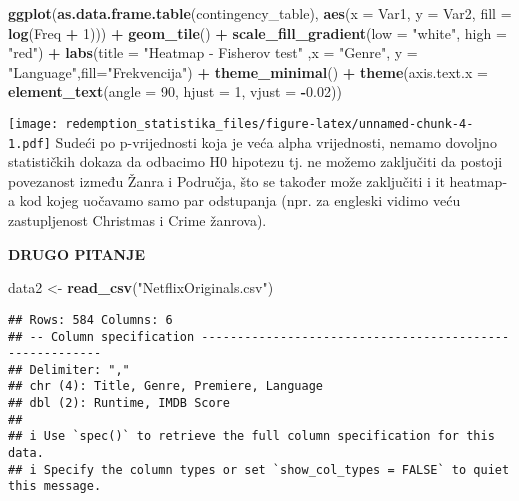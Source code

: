 \documentclass[
]{article}
\newenvironment{Shaded}{\begin{snugshade}}{\end{snugshade}}
\newcommand{\AttributeTok}[1]{\textcolor[rgb]{0.13,0.29,0.53}{#1}}
\newcommand{\DecValTok}[1]{\textcolor[rgb]{0.00,0.00,0.81}{#1}}
\newcommand{\FloatTok}[1]{\textcolor[rgb]{0.00,0.00,0.81}{#1}}
\newcommand{\FunctionTok}[1]{\textcolor[rgb]{0.13,0.29,0.53}{\textbf{#1}}}
\newcommand{\NormalTok}[1]{#1}
\newcommand{\OtherTok}[1]{\textcolor[rgb]{0.56,0.35,0.01}{#1}}
\newcommand{\SpecialCharTok}[1]{\textcolor[rgb]{0.81,0.36,0.00}{\textbf{#1}}}
\newcommand{\StringTok}[1]{\textcolor[rgb]{0.31,0.60,0.02}{#1}}
\begin{document}
\begin{Shaded}
\begin{Highlighting}[]
\FunctionTok{ggplot}\NormalTok{(}\FunctionTok{as.data.frame.table}\NormalTok{(contingency\_table), }\FunctionTok{aes}\NormalTok{(}\AttributeTok{x =}\NormalTok{ Var1, }\AttributeTok{y =}\NormalTok{ Var2, }\AttributeTok{fill =} \FunctionTok{log}\NormalTok{(Freq }\SpecialCharTok{+} \DecValTok{1}\NormalTok{))) }\SpecialCharTok{+}
  \FunctionTok{geom\_tile}\NormalTok{() }\SpecialCharTok{+}
  \FunctionTok{scale\_fill\_gradient}\NormalTok{(}\AttributeTok{low =} \StringTok{"white"}\NormalTok{, }\AttributeTok{high =} \StringTok{"red"}\NormalTok{) }\SpecialCharTok{+}
  \FunctionTok{labs}\NormalTok{(}\AttributeTok{title =} \StringTok{"Heatmap {-} Fisherov test"}\NormalTok{ ,}\AttributeTok{x =} \StringTok{"Genre"}\NormalTok{, }\AttributeTok{y =} \StringTok{"Language"}\NormalTok{,}\AttributeTok{fill=}\StringTok{"Frekvencija"}\NormalTok{) }\SpecialCharTok{+}
  \FunctionTok{theme\_minimal}\NormalTok{() }\SpecialCharTok{+}
  \FunctionTok{theme}\NormalTok{(}\AttributeTok{axis.text.x =} \FunctionTok{element\_text}\NormalTok{(}\AttributeTok{angle =} \DecValTok{90}\NormalTok{, }\AttributeTok{hjust =} \DecValTok{1}\NormalTok{, }\AttributeTok{vjust =} \SpecialCharTok{{-}}\FloatTok{0.02}\NormalTok{))}
\end{Highlighting}
\end{Shaded}

\texttt{[image: redemption\_statistika\_files/figure-latex/unnamed-chunk-4-1.pdf]}
Sudeći po p-vrijednosti koja je veća alpha vrijednosti, nemamo dovoljno
statističkih dokaza da odbacimo H0 hipotezu tj. ne možemo zaključiti da
postoji povezanost između Žanra i Područja, što se također može
zaključiti i it heatmap-a kod kojeg uočavamo samo par odstupanja (npr.
za engleski vidimo veću zastupljenost Christmas i Crime žanrova).

\textbf{DRUGO PITANJE}

\begin{Shaded}
\begin{Highlighting}[]
\NormalTok{data2 }\OtherTok{\textless{}{-}} \FunctionTok{read\_csv}\NormalTok{(}\StringTok{"NetflixOriginals.csv"}\NormalTok{)}
\end{Highlighting}
\end{Shaded}

\begin{verbatim}
## Rows: 584 Columns: 6
## -- Column specification --------------------------------------------------------
## Delimiter: ","
## chr (4): Title, Genre, Premiere, Language
## dbl (2): Runtime, IMDB Score
## 
## i Use `spec()` to retrieve the full column specification for this data.
## i Specify the column types or set `show_col_types = FALSE` to quiet this message.
\end{verbatim}
\end{document}
